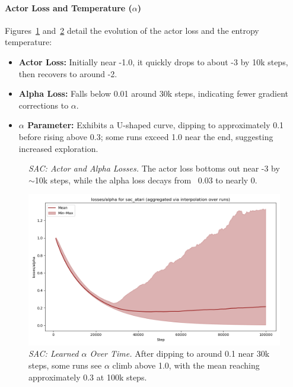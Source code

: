\paragraph{Actor Loss and Temperature (\(\alpha\))}
Figures~\ref{fig:sac_actor_alpha_losses} and~\ref{fig:sac_alpha} detail the evolution of the actor loss and the entropy temperature:
\begin{itemize}
	\item \textbf{Actor Loss:} Initially near -1.0, it quickly drops to about -3 by 10k steps, then recovers to around -2.
	\item \textbf{Alpha Loss:} Falls below 0.01 around 30k steps, indicating fewer gradient corrections to \(\alpha\).
	\item \textbf{\(\alpha\) Parameter:} Exhibits a U-shaped curve, dipping to approximately 0.1 before rising above 0.3; some runs exceed 1.0 near the end, suggesting increased exploration.
\end{itemize}

\begin{figure}
	\centering
	\quad
	\caption{\emph{SAC: Actor and Alpha Losses.} The actor loss bottoms out near -3 by \(\sim\)10k steps, while the alpha loss decays from ~0.03 to nearly 0.}
	\label{fig:sac_actor_alpha_losses}
\end{figure}

\begin{figure}
	\centering
	\includegraphics[width=.5\textwidth]{figures/sac/losses_alpha_sac_atari.png}
	\caption{\emph{SAC: Learned \(\alpha\) Over Time.} After dipping to around 0.1 near 30k steps, some runs see \(\alpha\) climb above 1.0, with the mean reaching approximately 0.3 at 100k steps.}
	\label{fig:sac_alpha}
\end{figure}

